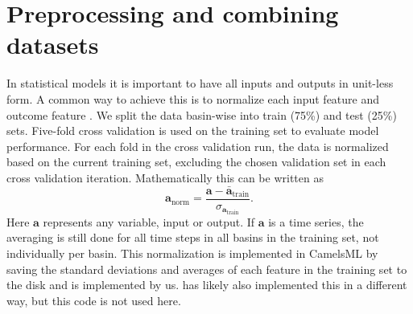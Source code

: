 \section{Preprocessing and combining datasets}
In statistical models it is important to have all inputs and outputs in unit-less 
form. A common way to achieve this is to normalize each input feature and outcome 
feature \citep{elemstatlearn}. 
We split the data basin-wise into train (75\%) and test (25\%) sets. 
Five-fold cross validation is used on the training set to evaluate model performance.
For each fold in the cross validation run, the data is normalized based on the current 
training set, excluding the chosen validation set in each cross validation iteration.
Mathematically this can be written as 
\begin{equation}
    \bm{a}_\text{norm} = \frac{\bm{a} - \bar{\bm{a}}_\text{train}}{\sigma_{\bm{a}_\text{train}}}. \label{normalization}
\end{equation}
Here $\bm{a}$ represents any variable, input or output. If $\bm{a}$ is a time series, 
the averaging is still done for all time steps in all basins in the training set, 
not individually per basin. This normalization is implemented in CamelsML by saving 
the standard deviations and averages of each feature in the training set to the disk 
and is implemented by us. \citet{lstm_third_paper} has likely also implemented this 
in a different way, but this code is not used here.

